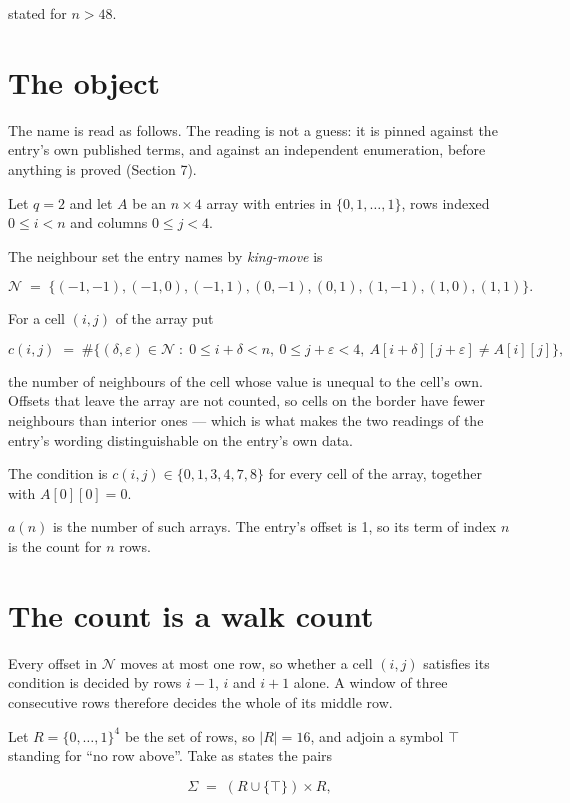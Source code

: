 \documentclass[11pt]{article}
\theoremstyle{definition}
\begin{document}
stated for $n > 48$.

\section{The object}

The name is read as follows. The reading is not a guess: it is pinned against the entry's own published terms, and against an independent enumeration, before anything is proved (Section 7).

Let $q = 2$ and let $A$ be an $n \times 4$ array with entries in $\{0,1,\dots,1\}$, rows indexed $0 \le i < n$ and columns $0 \le j < 4$.

The neighbour set the entry names by {\itshape king-move} is

\[\mathcal{N} \;=\; \{(-1,-1), (-1,0), (-1,1), (0,-1), (0,1), (1,-1), (1,0), (1,1)\}.\]

For a cell $(i,j)$ of the array put

\[c(i,j) \;=\; \#\bigl\{(\delta,\varepsilon)\in\mathcal{N} \;:\; 0\le i+\delta<n,\ 0\le j+\varepsilon<4,\ A[i+\delta][j+\varepsilon] \neq A[i][j]\bigr\},\]

the number of neighbours of the cell whose value is unequal to the cell's own. Offsets that leave the array are not counted, so cells on the border have fewer neighbours than interior ones --- which is what makes the two readings of the entry's wording distinguishable on the entry's own data.

The condition is $c(i,j) \in \{0, 1, 3, 4, 7, 8\}$ for every cell of the array, together with $A[0][0]=0$.

$a(n)$ is the number of such arrays. The entry's offset is 1, so its term of index $n$ is the count for $n$ rows.

\section{The count is a walk count}

Every offset in $\mathcal{N}$ moves at most one row, so whether a cell $(i,j)$ satisfies its condition is decided by rows $i-1$, $i$ and $i+1$ alone. A window of three consecutive rows therefore decides the whole of its middle row.

Let $R = \{0,\dots,1\}^{4}$ be the set of rows, so $|R| = 16$, and adjoin a symbol $\top$ standing for ``no row above''. Take as states the pairs

\[\Sigma \;=\; (R \cup \{\top\}) \times R,\]
\end{document}
